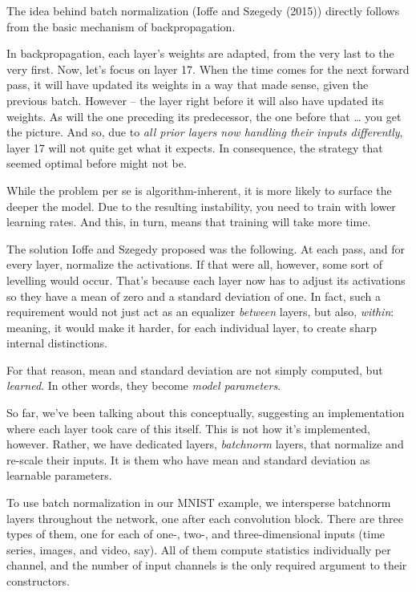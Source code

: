 \documentclass[
  letterpaper,
]{krantz}
\begin{document}
The idea behind batch normalization (Ioffe and Szegedy (2015)) directly
follows from the basic mechanism of backpropagation.

In backpropagation, each layer's weights are adapted, from the very last
to the very first. Now, let's focus on layer 17. When the time comes for
the next forward pass, it will have updated its weights in a way that
made sense, given the previous batch. However -- the layer right before
it will also have updated its weights. As will the one preceding its
predecessor, the one before that \ldots{} you get the picture. And so,
due to \emph{all prior layers now handling their inputs differently},
layer 17 will not quite get what it expects. In consequence, the
strategy that seemed optimal before might not be.

While the problem per se is algorithm-inherent, it is more likely to
surface the deeper the model. Due to the resulting instability, you need
to train with lower learning rates. And this, in turn, means that
training will take more time.

The solution Ioffe and Szegedy proposed was the following. At each pass,
and for every layer, normalize the activations. If that were all,
however, some sort of levelling would occur. That's because each layer
now has to adjust its activations so they have a mean of zero and a
standard deviation of one. In fact, such a requirement would not just
act as an equalizer \emph{between} layers, but also, \emph{within}:
meaning, it would make it harder, for each individual layer, to create
sharp internal distinctions.

For that reason, mean and standard deviation are not simply computed,
but \emph{learned}. In other words, they become \emph{model parameters}.

So far, we've been talking about this conceptually, suggesting an
implementation where each layer took care of this itself. This is not
how it's implemented, however. Rather, we have dedicated layers,
\emph{batchnorm} layers, that normalize and re-scale their inputs. It is
them who have mean and standard deviation as learnable parameters.

To use batch normalization in our MNIST example, we intersperse
batchnorm layers throughout the network, one after each convolution
block. There are three types of them, one for each of one-, two-, and
three-dimensional inputs (time series, images, and video, say). All of
them compute statistics individually per channel, and the number of
input channels is the only required argument to their constructors.
\end{document}
